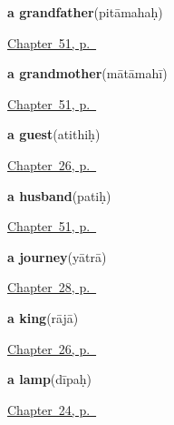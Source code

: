 \noindent\begin{minipage}[t]{\linewidth}
\raggedright
\textbf{a grandfather}\enspace\emph{}\enspace(pitāmahaḥ)\par
\footnotesize \hyperref[ch:sa-family-more]{Chapter~51, p.~\pageref*{ch:sa-family-more}}
\end{minipage}\par\smallskip

\noindent\begin{minipage}[t]{\linewidth}
\raggedright
\textbf{a grandmother}\enspace\emph{}\enspace(mātāmahī)\par
\footnotesize \hyperref[ch:sa-family-more]{Chapter~51, p.~\pageref*{ch:sa-family-more}}
\end{minipage}\par\smallskip

\noindent\begin{minipage}[t]{\linewidth}
\raggedright
\textbf{a guest}\enspace\emph{}\enspace(atithiḥ)\par
\footnotesize \hyperref[ch:sa-roles]{Chapter~26, p.~\pageref*{ch:sa-roles}}
\end{minipage}\par\smallskip

\noindent\begin{minipage}[t]{\linewidth}
\raggedright
\textbf{a husband}\enspace\emph{}\enspace(patiḥ)\par
\footnotesize \hyperref[ch:sa-family-more]{Chapter~51, p.~\pageref*{ch:sa-family-more}}
\end{minipage}\par\smallskip

\noindent\begin{minipage}[t]{\linewidth}
\raggedright
\textbf{a journey}\enspace\emph{}\enspace(yātrā)\par
\footnotesize \hyperref[ch:sa-leave-more]{Chapter~28, p.~\pageref*{ch:sa-leave-more}}
\end{minipage}\par\smallskip

\noindent\begin{minipage}[t]{\linewidth}
\raggedright
\textbf{a king}\enspace\emph{}\enspace(rājā)\par
\footnotesize \hyperref[ch:sa-roles]{Chapter~26, p.~\pageref*{ch:sa-roles}}
\end{minipage}\par\smallskip

\noindent\begin{minipage}[t]{\linewidth}
\raggedright
\textbf{a lamp}\enspace\emph{}\enspace(dīpaḥ)\par
\footnotesize \hyperref[ch:sa-ask-for]{Chapter~24, p.~\pageref*{ch:sa-ask-for}}
\end{minipage}\par\smallskip

